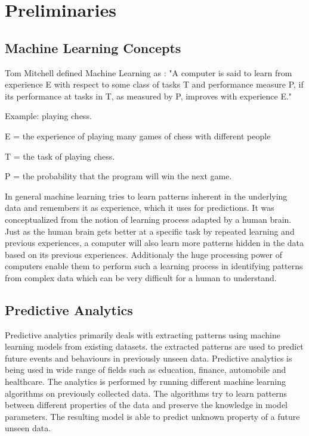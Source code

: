 \documentclass[11pt,openright]{report}
\begin{document}
\section{Preliminaries}\label{section:preliminaries}

\subsection{Machine Learning Concepts}

\noindent  Tom Mitchell defined Machine Learning as \cite{Mitchell1997}: 
\newline\newline
\hangindent=0.7cm "A computer is said to learn from experience E with respect to some class of tasks T and performance measure P, if its performance at tasks in T, as measured by P, improves with experience E." \newline 

\noindent Example: playing chess.

\noindent E = the experience of playing many games of chess with different people

\noindent T = the task of playing chess.

\noindent P = the probability that the program will win the next game.\newline 

\noindent In general machine learning tries to learn patterns inherent in the underlying data and remembers it as experience, which it uses for predictions. It was conceptualized from the notion of learning process adapted by a human brain. Just as the human brain gets better at a specific task by repeated learning and previous experiences, a computer will also learn more patterns hidden in the data based on its previous experiences. Additionaly the huge processing power of computers enable them to perform such a learning process in identifying patterns from complex data which can be very difficult for a human to understand.




\subsection{Predictive Analytics}
Predictive analytics primarily deals with extracting patterns using machine learning models from existing datasets. the extracted patterns are used to predict future events and behaviours in previously unseen data. Predictive analytics is being used in wide range of fields such as education, finance, automobile and healthcare. The analytics is performed by running different machine learning algorithms on previously collected data. The algorithms try to learn patterns between different properties of the data and preserve the knowledge in model parameters. The resulting model is able to predict unknown property of a future unseen data.
 
\end{document}
